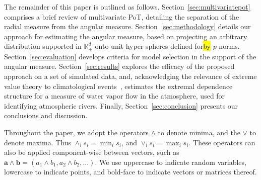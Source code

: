 \documentclass[iicol,sn-basic]{sn-jnl}
\theoremstyle{thmstyleone}
\begin{document}
The remainder of this paper is outlined as follows. Section~\ref{sec:multivariatepot} comprises a brief review of multivariate PoT, detailing the separation of the radial measure from the angular measure. Section~\ref{sec:methodology} details our approach for estimating the angular measure, based on projecting an arbitrary distribution supported in ${\mathbb R}_+^d$ onto unit hyper-spheres defined \st{for}\hl{by} $p$-norms. Section~\ref{sec:evaluation} develops criteria for model selection in the support of the angular measure.  Section~\ref{sec:results} explores the efficacy of the proposed approach on a set of simulated data, and, acknowledging the relevance of extreme value theory to climatological events~\citep{jentsch2007,vousdoukas2018,li2019}, estimates the extremal dependence structure for a measure of water vapor flow in the atmosphere, used for identifying atmospheric rivers.  Finally, Section~\ref{sec:conclusion} presents our conclusions and discussion.

Throughout the paper, we adopt the operators $\wedge$ to denote minima, and the $\vee$ to denote maxima.  Thus $\wedge_i s_i = \min_i s_i$, and $\vee_i s_i = \max_i s_i$.  These operators can also be applied component-wise between vectors, such as $\bm{a}\wedge\bm{b} = (a_1\wedge b_1, a_2\wedge b_2,\ldots)$.  We use uppercase to indicate random variables, lowercase to indicate points, and bold-face to indicate vectors or matrices thereof.
\end{document}
